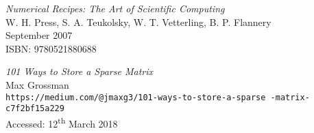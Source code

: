 \documentclass[a4paper]{article}
\begin{document}
\pagebreak
\begin{thebibliography}{9}

		\emph{Numerical Recipes: The Art of Scientific Computing}\\
		W. H. Press, S. A. Teukolsky, W. T. Vetterling, B. P. Flannery\\
		September 2007\\
		ISBN: 9780521880688

		\emph{101 Ways to Store a Sparse Matrix}\\
		Max Grossman\\
		\texttt{https://medium.com/@jmaxg3/101-ways-to-store-a-sparse
		-matrix-c7f2bf15a229}\\
		Accessed: 12\textsuperscript{th} March 2018

\end{thebibliography}
\end{document}
